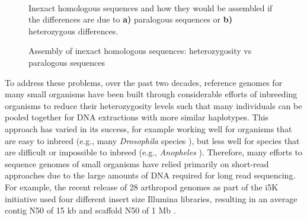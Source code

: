 \begin{figure}[htbp!]

\begin{centering}
\caption{Assembly of inexact homologous sequences: heterozygosity vs paralogous sequences}\label{figure:assembly}

 \\

\par{Inexact homologous sequences and how they would be assembled if the differences are due to \textbf{a)} paralogous sequences or \textbf{b)} heterozygous differences. }
\end{centering}
\end{figure}


\par{
To address these problems, over the past two decades, reference genomes for many small organisms have been built through considerable efforts of inbreeding organisms to reduce their heterozygosity levels such that many individuals can be pooled together for DNA extractions with more similar haplotypes. This approach has varied in its success, for example working well for organisms that are easy to inbreed (e.g., many \textit{Drosophila} species \cite{Drosophila_12_Genomes_Consortium2007-fx}), but less well for species that are difficult or impossible to inbreed (e.g., \textit{Anopheles} \cite{Neafsey2015-op}). Therefore, many efforts to sequence genomes of small organisms have relied primarily on short-read approaches due to the large amounts of DNA required for long read sequencing. For example, the recent release of 28 arthropod genomes as part of the i5K initiative used four different insert size Illumina libraries, resulting in an average contig N50 of 15 kb and scaffold N50 of 1 Mb \cite{Thomas2018-rk}.
}

